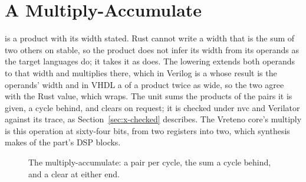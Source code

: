 \section{A Multiply-Accumulate}
\label{sec:x-mul}

 is a product with its width stated. Rust cannot write
a width that is the sum of two others on stable, so the product does
not infer its width from its operands as the target languages do; it
takes it as  does. The lowering extends both operands
to that width and multiplies there, which in Verilog is a
\code{*} whose result is the operands' width and in VHDL a
 of a product twice as wide, so the two agree with the
Rust value, which wraps. The unit sums the products of the pairs it
is given, a cycle behind, and clears on request; it is checked under
nvc and Verilator against its trace, as Section~\ref{sec:x-checked}
describes. The Vreteno core's multiply is this operation at
sixty-four bits, from two registers into two, which synthesis makes
of the part's DSP blocks.

\begin{figure}[htbp]
\centering

\caption{The multiply-accumulate: a pair per cycle, the sum a cycle
behind, and a clear at either end.}
\label{fig:x-mul}
\end{figure}




